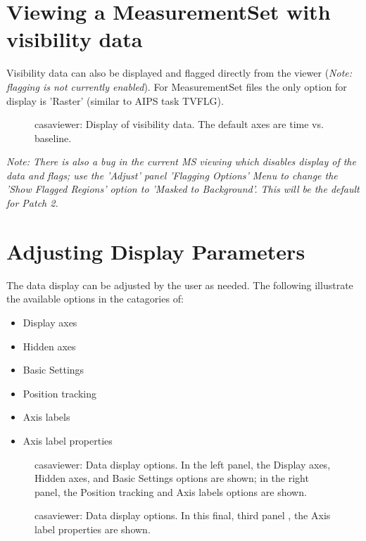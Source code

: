 \section{Viewing a MeasurementSet with visibility data}
\label{section:viewer.MS}

Visibility data can also be displayed and flagged directly from the
viewer ({\it Note: flagging is not currently enabled}). For
MeasurementSet files the only option for display is 'Raster' (similar
to AIPS task TVFLG).

\begin{figure}[h]
\caption{\label{fig:viewer_ms1} casaviewer: Display of visibility
  data. The default axes are time vs. baseline.} 
\hrulefill
\end{figure}
 

{\it Note: There is also a bug in the current MS viewing which
disables display of the data and flags; use the 'Adjust' panel
'Flagging Options' Menu to change the 'Show Flagged Regions' option to
'Masked to Background'. This will be the default for Patch 2.}

\section{Adjusting Display Parameters}
\label{section:viewer.adjust}

The data display can be adjusted by the user as needed. The following
illustrate the available options in the catagories of: 
\begin{itemize}
   \item Display axes
   \item Hidden axes
   \item Basic Settings
   \item Position tracking
   \item Axis labels
   \item Axis label properties
\end{itemize}

\begin{figure}[ht]
\caption{\label{fig:datadisplay} casaviewer: Data display options. In
  the left panel, the Display axes, Hidden axes, and Basic Settings
  options are shown; in the right panel, the Position tracking and
  Axis labels options are shown. }

\end{figure}
\begin{figure}[h]
\caption{\label{fig:datadisplay-p3} casaviewer: Data display options. In
  this final, third panel , the Axis label properties are shown. }
\hrulefill
\end{figure}
 

